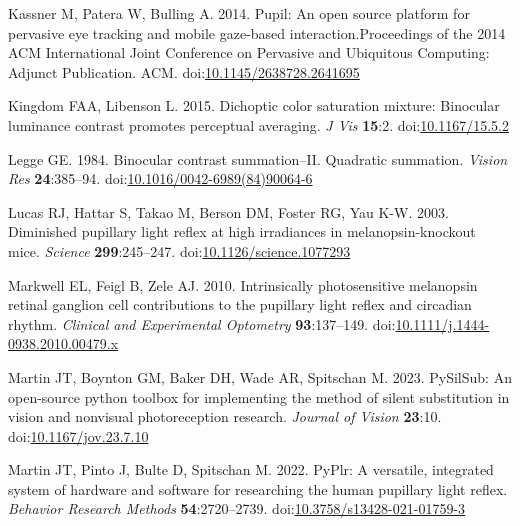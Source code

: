 \documentclass[
]{article}
\newlength{\cslhangindent}
\newlength{\cslentryspacingunit} %
\newenvironment{CSLReferences}[2] %
 {%
  \setlength{\parindent}{0pt}
  \ifodd #1
  \let\oldpar\par
  \def\par{\hangindent=\cslhangindent\oldpar}
  \fi
  \setlength{\parskip}{#2\cslentryspacingunit}
 }%
 {}
\begin{document}
\begin{CSLReferences}{1}{0}
\leavevmode{}%
Kassner M, Patera W, Bulling A. 2014. Pupil: An open source platform for pervasive eye tracking and mobile gaze-based interaction.Proceedings of the 2014 {ACM} International Joint Conference on Pervasive and Ubiquitous Computing: Adjunct Publication. {ACM}. doi:\href{https://doi.org/10.1145/2638728.2641695}{10.1145/2638728.2641695}

\leavevmode{}%
Kingdom FAA, Libenson L. 2015. Dichoptic color saturation mixture: Binocular luminance contrast promotes perceptual averaging. \emph{J Vis} \textbf{15}:2. doi:\href{https://doi.org/10.1167/15.5.2}{10.1167/15.5.2}

\leavevmode{}%
Legge GE. 1984. Binocular contrast summation--II. Quadratic summation. \emph{Vision Res} \textbf{24}:385--94. doi:\href{https://doi.org/10.1016/0042-6989(84)90064-6}{10.1016/0042-6989(84)90064-6}

\leavevmode{}%
Lucas RJ, Hattar S, Takao M, Berson DM, Foster RG, Yau K-W. 2003. Diminished pupillary light reflex at high irradiances in melanopsin-knockout mice. \emph{Science} \textbf{299}:245--247. doi:\href{https://doi.org/10.1126/science.1077293}{10.1126/science.1077293}

\leavevmode{}%
Markwell EL, Feigl B, Zele AJ. 2010. Intrinsically photosensitive melanopsin retinal ganglion cell contributions to the pupillary light reflex and circadian rhythm. \emph{Clinical and Experimental Optometry} \textbf{93}:137--149. doi:\href{https://doi.org/10.1111/j.1444-0938.2010.00479.x}{10.1111/j.1444-0938.2010.00479.x}

\leavevmode{}%
Martin JT, Boynton GM, Baker DH, Wade AR, Spitschan M. 2023. PySilSub: An open-source python toolbox for implementing the method of silent substitution in vision and nonvisual photoreception research. \emph{Journal of Vision} \textbf{23}:10. doi:\href{https://doi.org/10.1167/jov.23.7.10}{10.1167/jov.23.7.10}

\leavevmode{}%
Martin JT, Pinto J, Bulte D, Spitschan M. 2022. PyPlr: A versatile, integrated system of hardware and software for researching the human pupillary light reflex. \emph{Behavior Research Methods} \textbf{54}:2720--2739. doi:\href{https://doi.org/10.3758/s13428-021-01759-3}{10.3758/s13428-021-01759-3}


\end{CSLReferences}
\end{document}
